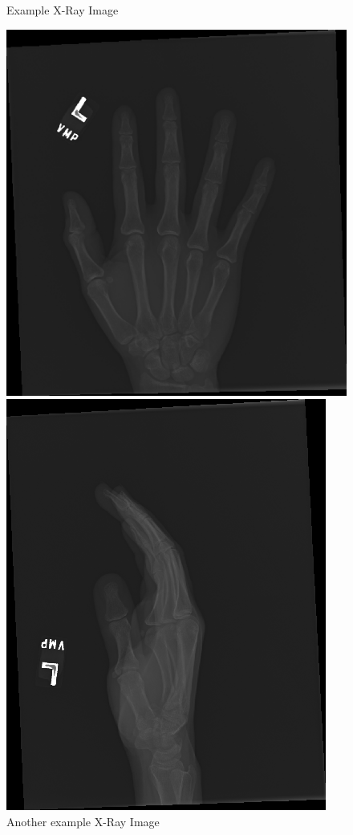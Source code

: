 \documentclass[11pt]{article} %
\theoremstyle{plain}
\theoremstyle{definition}
\begin{document}
\begin{figure}
  \centering    
  \caption{Example X-Ray Image}
  \label{fig:xray1}
  \includegraphics[scale=0.5]{image1.png}
  \caption{Another example X-Ray Image}
  \label{fig:xray2}
  \includegraphics[scale=0.5]{image2.png}

\end{figure}
\end{document}
